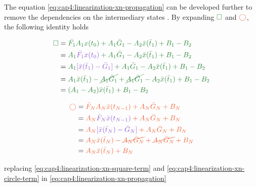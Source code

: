 The equation \eqref{eq:cap4:linearization-xn-propagation} can be developed further to remove the dependencies on the intermediary states 
. By expanding $\green{\square}$ and $\orange{\bigcirc}$, the following identity holds

\noindent
\begin{align}
    \label{eq:cap4:linearization-xn-square-term}
    \green{\square} &= \green{\bar{F_1} A_1 x(t_0) + A_1 \bar{G}_1 - A_2 \bar{x}(\bar{t}_1) + B_1 - B_2} \nonumber \\
                    &= \green{A_1 \purple{\bar{F_1} x(t_0)} + A_1 \bar{G}_1 - A_2 \bar{x}(\bar{t}_1) + B_1 - B_2} \nonumber \\
                    &= \green{A_1 \purple{[\bar{x}(\bar{t}_1) - \bar{G}_1]} + A_1 \bar{G}_1 - A_2 \bar{x}(\bar{t}_1) + B_1 - B_2} \nonumber \\
                    &= \green{A_1 \bar{x}(\bar{t}_1) - \cancel{A_1 \bar{G}_1} + \cancel{A_1 \bar{G}_1} - A_2 \bar{x}(\bar{t}_1) + B_1 - B_2} \nonumber \\
                    &= \green{(A_1 - A_2) \bar{x}(\bar{t}_1) + B_1 - B_2}
\end{align}

\noindent
\begin{align}
    \label{eq:cap4:linearization-xn-circle-term}
    \orange{\bigcirc} &= \orange{\bar{F}_{N} A_{N} \bar{x}(t_{N-1}) + A_{N} \bar{G}_{N} + B_{N}} \nonumber \\
                     &= \orange{A_{N} \purple{\bar{F}_{N} \bar{x}(t_{N-1})} + A_{N} \bar{G}_{N} + B_{N}} \nonumber \\
                     &= \orange{A_{N} \purple{[\bar{x}(\bar{t}_N) - \bar{G}_{N}]} + A_{N} \bar{G}_{N} + B_{N}} \nonumber \\
                     &= \orange{A_{N} \bar{x}(\bar{t}_N) - \cancel{A_{N} \bar{G}_{N}} + \cancel{A_{N} \bar{G}_{N}} + B_{N}} \nonumber \\
                     &= \orange{A_{N} \bar{x}(\bar{t}_N) + B_{N}}
\end{align}

\noindent 
replacing \eqref{eq:cap4:linearization-xn-square-term} and \eqref{eq:cap4:linearization-xn-circle-term} in \eqref{eq:cap4:linearization-xn-propagation}

